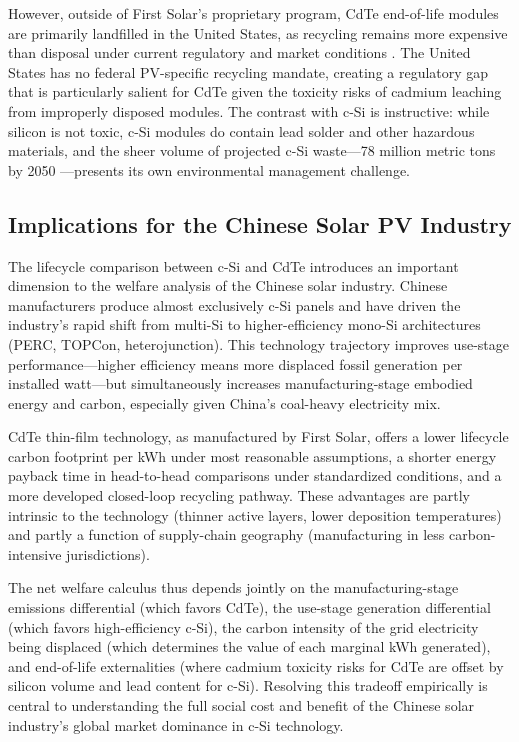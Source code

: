 \documentclass{article}
\begin{document}
However, outside of First Solar's proprietary program, CdTe end-of-life modules are primarily landfilled in the United States, as recycling remains more expensive than disposal under current regulatory and market conditions \citep{doe2024CdTe}. The United States has no federal PV-specific recycling mandate, creating a regulatory gap that is particularly salient for CdTe given the toxicity risks of cadmium leaching from improperly disposed modules. The contrast with c-Si is instructive: while silicon is not toxic, c-Si modules do contain lead solder and other hazardous materials, and the sheer volume of projected c-Si waste---78 million metric tons by 2050 \citep{irena2016}---presents its own environmental management challenge.
 
\subsection{Implications for the Chinese Solar PV Industry}
 
The lifecycle comparison between c-Si and CdTe introduces an important dimension to the welfare analysis of the Chinese solar industry. Chinese manufacturers produce almost exclusively c-Si panels and have driven the industry's rapid shift from multi-Si to higher-efficiency mono-Si architectures (PERC, TOPCon, heterojunction). This technology trajectory improves use-stage performance---higher efficiency means more displaced fossil generation per installed watt---but simultaneously increases manufacturing-stage embodied energy and carbon, especially given China's coal-heavy electricity mix.
 
CdTe thin-film technology, as manufactured by First Solar, offers a lower lifecycle carbon footprint per kWh under most reasonable assumptions, a shorter energy payback time in head-to-head comparisons under standardized conditions, and a more developed closed-loop recycling pathway. These advantages are partly intrinsic to the technology (thinner active layers, lower deposition temperatures) and partly a function of supply-chain geography (manufacturing in less carbon-intensive jurisdictions).
 
The net welfare calculus thus depends jointly on the manufacturing-stage emissions differential (which favors CdTe), the use-stage generation differential (which favors high-efficiency c-Si), the carbon intensity of the grid electricity being displaced (which determines the value of each marginal kWh generated), and end-of-life externalities (where cadmium toxicity risks for CdTe are offset by silicon volume and lead content for c-Si). Resolving this tradeoff empirically is central to understanding the full social cost and benefit of the Chinese solar industry's global market dominance in c-Si technology.
\end{document}

